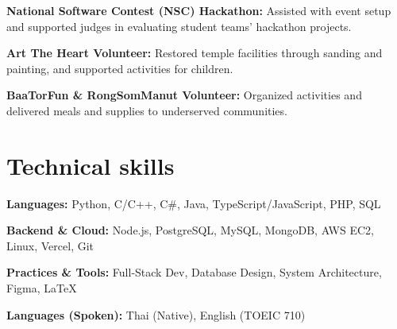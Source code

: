 \documentclass[11pt,a4paper]{article}
\newcommand{\entry}[2]{%
  \begin{minipage}[t]{0.85\textwidth}\raggedright #1\end{minipage}%
  \hfill%
  \begin{minipage}[t]{0.15\textwidth}\raggedleft\textit{#2}\end{minipage}%
  \par\vspace{1pt}%
}
\newcommand{\skill}[2]{\textbf{#1:} #2\par\vspace{1.5pt}}
\begin{document}
\entry{\textbf{National Software Contest (NSC) Hackathon:} Assisted with event setup and supported judges in evaluating student teams' hackathon projects.}{}

\noindent\textbf{Art The Heart Volunteer:} Restored temple facilities through sanding and painting, and supported activities for children.

\noindent\textbf{BaaTorFun \& RongSomManut Volunteer:} Organized activities and delivered meals and supplies to underserved communities.


\section{Technical skills}
\skill{Languages}{Python, C/C++, C\#, Java, TypeScript/JavaScript, PHP, SQL}
\skill{Backend \& Cloud}{Node.js, PostgreSQL, MySQL, MongoDB, AWS EC2, Linux, Vercel, Git}
\skill{Practices \& Tools}{Full-Stack Dev, Database Design, System Architecture, Figma, LaTeX}
\skill{Languages (Spoken)}{Thai (Native), English (TOEIC 710)}
\end{document}
